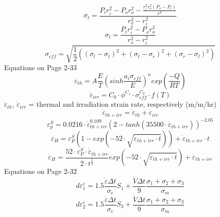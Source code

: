 \documentclass[12pt]{article}
\begin{document}
\begin{equation}
\sigma_t=\frac{P_{i}r_{i}^2-P_{o}r_{o}^2-\frac{r_{i}^2 r_{o}^2 \left( P_{o}-P_{i} \right)}{r^2}}{r_{o}^2-r_{i}^2}
\end{equation}
\begin{equation}
\sigma_{l}=\frac{P_{i}r_{i}^{2}-P_{o}r_{o}^{2}}{r_{o}^{2}-r_{i}^{2}}
\end{equation}
\begin{equation}
\sigma_{eff}= \sqrt{\frac{1}{2}\left( \left(\sigma_l-\sigma_t \right)^2+\left(\sigma_t-\sigma_r \right)^2+\left(\sigma_r-\sigma_l \right)^2 \right)}
\end{equation}
Equations on Page 2-33
\begin{equation}
\dot{\varepsilon}_{th}=A\frac{E}{T} \left( sinh \frac{a_i \sigma_{eff}}{E} \right)^n exp \left( \frac{-Q}{RT} \right)
\end{equation}
\begin{equation}
\dot{\varepsilon}_{irr}=C_0\cdot \phi^{C_1}\cdot\sigma_{eff}^{C_2}\cdot f(T)
\end{equation}
$\dot{\varepsilon}_{th}$, $\dot{\varepsilon}_{irr}$  = thermal and irradiation strain rate, respectively (m/m/hr)
\begin{equation}
\dot{\varepsilon}_{th+irr}=\dot{\varepsilon}_{th}+\dot{\varepsilon}_{irr}
\end{equation}
\begin{equation}
\varepsilon_p^S=0.0216\cdot \dot{\varepsilon}_{th+irr}^{0.109} \left( 2 - tanh \left( 35500 \cdot \dot{\varepsilon}_{th+irr} \right) \right)^{-2.05}
\end{equation}
\begin{equation}
\varepsilon_H= \varepsilon_P^S \left( 1-exp \left( -52 \cdot \sqrt{\dot{\varepsilon}_{th+irr} \cdot t} \right) \right)+\dot{\varepsilon}_{th+irr} \cdot t
\end{equation}
\begin{equation}
\dot{\varepsilon}_H= \frac{52 \cdot \varepsilon_P^S \cdot \dot{\varepsilon}_{th+irr}}{2 \cdot t^{\frac{1}{2}}} exp \left( -52 \cdot \sqrt{\dot{\varepsilon}_{th+irr} \cdot t} \right) +\dot{\varepsilon}_{th+irr}
\end{equation}
Equations on Page 2-32
\begin{equation}
d\varepsilon_1^c=1.5 \frac{\dot{\varepsilon}\Delta t}{\sigma_e}S_1+\frac{\dot{V}\Delta t}{9} \frac{\sigma_1+\sigma_2+\sigma_3}{\sigma_m}
\end{equation}
\begin{equation}
d\varepsilon_2^c=1.5 \frac{\dot{\varepsilon}\Delta t}{\sigma_e}S_2+\frac{\dot{V}\Delta t}{9} \frac{\sigma_1+\sigma_2+\sigma_3}{\sigma_m}
\end{equation}
\end{document}
